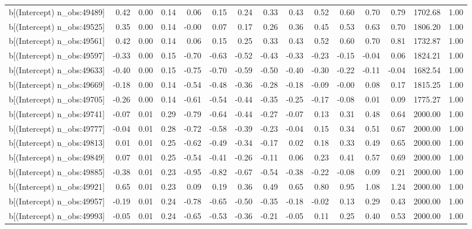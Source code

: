 \begin{table}[ht]
\begin{tabular}{rrrrrrrrrrrrrrr}
  b[(Intercept) n\_obs:49489] & 0.42 & 0.00 & 0.14 & 0.06 & 0.15 & 0.24 & 0.33 & 0.43 & 0.52 & 0.60 & 0.70 & 0.79 & 1702.68 & 1.00 \\ 
  b[(Intercept) n\_obs:49525] & 0.35 & 0.00 & 0.14 & -0.00 & 0.07 & 0.17 & 0.26 & 0.36 & 0.45 & 0.53 & 0.63 & 0.70 & 1806.20 & 1.00 \\ 
  b[(Intercept) n\_obs:49561] & 0.42 & 0.00 & 0.14 & 0.06 & 0.15 & 0.25 & 0.33 & 0.43 & 0.52 & 0.60 & 0.70 & 0.81 & 1732.87 & 1.00 \\ 
  b[(Intercept) n\_obs:49597] & -0.33 & 0.00 & 0.15 & -0.70 & -0.63 & -0.52 & -0.43 & -0.33 & -0.23 & -0.15 & -0.04 & 0.06 & 1824.21 & 1.00 \\ 
  b[(Intercept) n\_obs:49633] & -0.40 & 0.00 & 0.15 & -0.75 & -0.70 & -0.59 & -0.50 & -0.40 & -0.30 & -0.22 & -0.11 & -0.04 & 1682.54 & 1.00 \\ 
  b[(Intercept) n\_obs:49669] & -0.18 & 0.00 & 0.14 & -0.54 & -0.48 & -0.36 & -0.28 & -0.18 & -0.09 & -0.00 & 0.08 & 0.17 & 1815.25 & 1.00 \\ 
  b[(Intercept) n\_obs:49705] & -0.26 & 0.00 & 0.14 & -0.61 & -0.54 & -0.44 & -0.35 & -0.25 & -0.17 & -0.08 & 0.01 & 0.09 & 1775.27 & 1.00 \\ 
  b[(Intercept) n\_obs:49741] & -0.07 & 0.01 & 0.29 & -0.79 & -0.64 & -0.44 & -0.27 & -0.07 & 0.13 & 0.31 & 0.48 & 0.64 & 2000.00 & 1.00 \\ 
  b[(Intercept) n\_obs:49777] & -0.04 & 0.01 & 0.28 & -0.72 & -0.58 & -0.39 & -0.23 & -0.04 & 0.15 & 0.34 & 0.51 & 0.67 & 2000.00 & 1.00 \\ 
  b[(Intercept) n\_obs:49813] & 0.01 & 0.01 & 0.25 & -0.62 & -0.49 & -0.34 & -0.17 & 0.02 & 0.18 & 0.33 & 0.49 & 0.65 & 2000.00 & 1.00 \\ 
  b[(Intercept) n\_obs:49849] & 0.07 & 0.01 & 0.25 & -0.54 & -0.41 & -0.26 & -0.11 & 0.06 & 0.23 & 0.41 & 0.57 & 0.69 & 2000.00 & 1.00 \\ 
  b[(Intercept) n\_obs:49885] & -0.38 & 0.01 & 0.23 & -0.95 & -0.82 & -0.67 & -0.54 & -0.38 & -0.22 & -0.08 & 0.09 & 0.21 & 2000.00 & 1.00 \\ 
  b[(Intercept) n\_obs:49921] & 0.65 & 0.01 & 0.23 & 0.09 & 0.19 & 0.36 & 0.49 & 0.65 & 0.80 & 0.95 & 1.08 & 1.24 & 2000.00 & 1.00 \\ 
  b[(Intercept) n\_obs:49957] & -0.19 & 0.01 & 0.24 & -0.78 & -0.65 & -0.50 & -0.35 & -0.18 & -0.02 & 0.13 & 0.29 & 0.43 & 2000.00 & 1.00 \\ 
  b[(Intercept) n\_obs:49993] & -0.05 & 0.01 & 0.24 & -0.65 & -0.53 & -0.36 & -0.21 & -0.05 & 0.11 & 0.25 & 0.40 & 0.53 & 2000.00 & 1.00 \\ 

\end{tabular}
\end{table}
